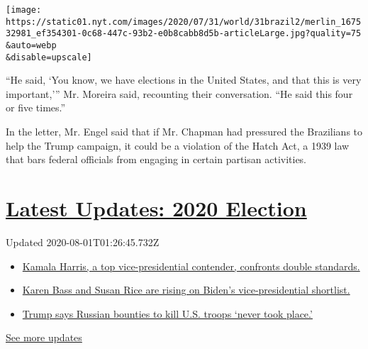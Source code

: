 \texttt{[image: https://static01.nyt.com/images/2020/07/31/world/31brazil2/merlin\_167532981\_ef354301-0c68-447c-93b2-e0b8cabb8d5b-articleLarge.jpg?quality=75\\\&auto=webp\\\&disable=upscale]}

``He said, `You know, we have elections in the United States, and that
this is very important,''' Mr. Moreira said, recounting their
conversation. ``He said this four or five times.''

In the letter, Mr. Engel said that if Mr. Chapman had pressured the
Brazilians to help the Trump campaign, it could be a violation of the
Hatch Act, a 1939 law that bars federal officials from engaging in
certain partisan activities.

\hypertarget{latest-updates-2020-election}{%
\section{\texorpdfstring{\href{https://www.nytimes.com/2020/07/31/us/elections/biden-vs-trump.html?action=click\&pgtype=Article\&state=default\&region=MAIN_CONTENT_1\&context=storylines_live_updates}{Latest
Updates: 2020
Election}}{Latest Updates: 2020 Election}}\label{latest-updates-2020-election}}

Updated 2020-08-01T01:26:45.732Z

\begin{itemize}
\tightlist
\item
  \href{https://www.nytimes.com/2020/07/31/us/elections/biden-vs-trump.html?action=click\&pgtype=Article\&state=default\&region=MAIN_CONTENT_1\&context=storylines_live_updates\#link-29fdff45}{Kamala
  Harris, a top vice-presidential contender, confronts double
  standards.}
\item
  \href{https://www.nytimes.com/2020/07/31/us/elections/biden-vs-trump.html?action=click\&pgtype=Article\&state=default\&region=MAIN_CONTENT_1\&context=storylines_live_updates\#link-13ec3d9c}{Karen
  Bass and Susan Rice are rising on Biden's vice-presidential
  shortlist.}
\item
  \href{https://www.nytimes.com/2020/07/31/us/elections/biden-vs-trump.html?action=click\&pgtype=Article\&state=default\&region=MAIN_CONTENT_1\&context=storylines_live_updates\#link-49e9a016}{Trump
  says Russian bounties to kill U.S. troops `never took place.'}
\end{itemize}

\href{https://www.nytimes.com/2020/07/31/us/elections/biden-vs-trump.html?action=click\&pgtype=Article\&state=default\&region=MAIN_CONTENT_1\&context=storylines_live_updates}{See
more updates}

